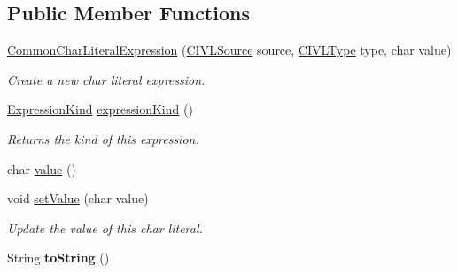 \subsection*{Public Member Functions}
\begin{DoxyCompactItemize}
\item 
\hyperlink{classedu_1_1udel_1_1cis_1_1vsl_1_1civl_1_1model_1_1common_1_1expression_1_1CommonCharLiteralExpression_afb8d9e6a4553cb200487bbfcc26894dc}{Common\+Char\+Literal\+Expression} (\hyperlink{interfaceedu_1_1udel_1_1cis_1_1vsl_1_1civl_1_1model_1_1IF_1_1CIVLSource}{C\+I\+V\+L\+Source} source, \hyperlink{interfaceedu_1_1udel_1_1cis_1_1vsl_1_1civl_1_1model_1_1IF_1_1type_1_1CIVLType}{C\+I\+V\+L\+Type} type, char value)
\begin{DoxyCompactList}\small\item\em Create a new char literal expression. \end{DoxyCompactList}\item 
\hyperlink{enumedu_1_1udel_1_1cis_1_1vsl_1_1civl_1_1model_1_1IF_1_1expression_1_1Expression_1_1ExpressionKind}{Expression\+Kind} \hyperlink{classedu_1_1udel_1_1cis_1_1vsl_1_1civl_1_1model_1_1common_1_1expression_1_1CommonCharLiteralExpression_a96123e5a8a07ad5559b3b9e9b056bb44}{expression\+Kind} ()
\begin{DoxyCompactList}\small\item\em Returns the kind of this expression. \end{DoxyCompactList}\item 
char \hyperlink{classedu_1_1udel_1_1cis_1_1vsl_1_1civl_1_1model_1_1common_1_1expression_1_1CommonCharLiteralExpression_a15ff509fabfa6f04705e73cacfd41b07}{value} ()
\item 
void \hyperlink{classedu_1_1udel_1_1cis_1_1vsl_1_1civl_1_1model_1_1common_1_1expression_1_1CommonCharLiteralExpression_a9919cfa8cb6715546fc6916a0f2edada}{set\+Value} (char value)
\begin{DoxyCompactList}\small\item\em Update the value of this char literal. \end{DoxyCompactList}\item 
\hypertarget{classedu_1_1udel_1_1cis_1_1vsl_1_1civl_1_1model_1_1common_1_1expression_1_1CommonCharLiteralExpression_a4d0277bfcf7fd45019b85a0af0a424d5}{}String {\bfseries to\+String} ()\label{classedu_1_1udel_1_1cis_1_1vsl_1_1civl_1_1model_1_1common_1_1expression_1_1CommonCharLiteralExpression_a4d0277bfcf7fd45019b85a0af0a424d5}


\end{DoxyCompactItemize}
